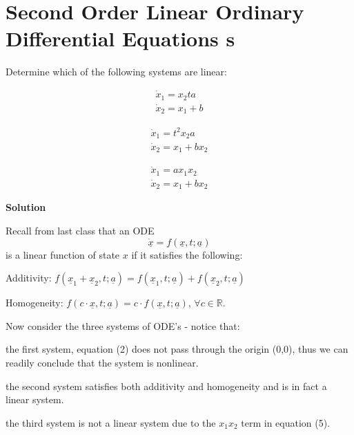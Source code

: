 \chapter{Second Order Linear Ordinary Differential Equations \ode{}s}

\begin{example} Determine which of the following systems are linear:
\begin{fullwidth}
\begin{colenumerate}[3]
\item
\begin{align}
\dot x_1 = x_2ta \\
\dot x_2 = x_1+b
\end{align}
\item
\begin{align}
\dot x_1 = t^2x_2a\\
\dot x_2 = x_1 + bx_2
\end{align}
\item
\begin{align}
\dot x_1 = ax_1x_2\\
\dot x_2 = x_1+bx_2
\end{align}
\end{colenumerate}
\end{fullwidth}
\end{example}

\textbf{Solution} 

Recall from last class that an ODE
\begin{equation}\label{eq: gen ode}
\underline {\dot x} =f(\underline x, t;\underline a)
\end{equation}
is a linear function of state $x$ if it satisfies the following:

\begin{compactitem}
\item Additivity:  $f(\underline x_1+\underline x_2, t;\underline a) = f(\underline x_1, t; \underline a)+f(\underline x_2,t;\underline a)$
\item Homogeneity: $f(c\cdot \underline x, t;\underline a) = c\cdot f(\underline x, t; \underline a)$,  $\forall c \in \mathbb R $.
\end{compactitem}

Now consider the three systems of ODE's - notice that: 
\begin{compactenum}
\item  the first system, equation (2) does not pass through the origin (0,0), thus we can readily conclude that the system is nonlinear.
\item  the second system satisfies both additivity and homogeneity and is in fact a linear system. 
\item the third system is not a linear system due to the $x_1x_2$ term in equation (5). 
\end{compactenum}

